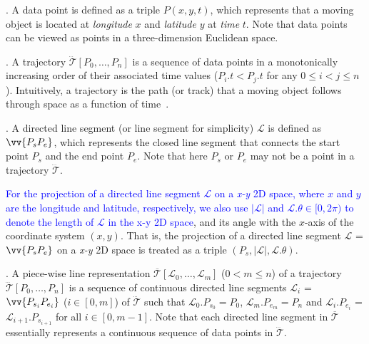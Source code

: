 . A data point is defined as a triple $P(x, y, t)$, which represents that a moving object is located at {\em longitude} $x$ and {\em latitude} $y$ at {\em time} $t$. Note that data points can be viewed as points in a three-dimension Euclidean space.

. A trajectory $\dddot{\mathcal{T}}[P_0, \ldots, P_n]$ is a sequence of data points in a monotonically increasing order of their associated time values (\ie $P_i.t < P_j.t$ for any $0\le i<j\le n$). Intuitively, a trajectory is the path (or track) that a moving object follows through space as a function of time~\cite{physics-trajectory}.


. A directed line segment (or line segment for simplicity) $\mathcal{L}$ is defined as $\vv{P_{s}P_{e}}$, which represents the closed line segment that connects the start point $P_s$ and the end point $P_e$.
Note that here $P_s$ or $P_e$ may not be a point in a trajectory $\dddot{\mathcal{T}}$.


\textcolor{blue}{For the projection of a directed line segment $\mathcal{L}$ on a \emph{x-y} 2D space, where $x$ and $y$ are the longitude and latitude, respectively, we also use $|\mathcal{L}|$ and $\mathcal{L}.\theta\in [0, 2\pi)$ to denote the length of $\mathcal{L}$ in the x-y 2D space}, and its angle with the $x$-axis of the coordinate system $(x, y)$.
 That is, the projection of a directed line segment $\mathcal{L}$ = $\vv{P_{s}P_{e}}$ on a \emph{x-y} 2D space is treated as a triple $(P_s, |\mathcal{L}|, \mathcal{L}.\theta)$.


. A piece-wise line representation $\overline{\mathcal{T}}[\mathcal{L}_0, \ldots , \mathcal{L}_m]$ ($0< m \le n$) of a trajectory $\dddot{\mathcal{T}}[P_0, \ldots, P_n]$ is a sequence of continuous directed line segments $\mathcal{L}_{i}$ = $\vv{P_{s_i}P_{e_i}}$ ($i\in[0,m]$) of $\dddot{\mathcal{T}}$  such that $\mathcal{L}_{0}.P_{s_0} = P_0$, $\mathcal{L}_{m}.P_{e_m} = P_n$ and  $\mathcal{L}_{i}.P_{e_i}$ = $\mathcal{L}_{i+1}.P_{s_{i+1}}$ for all $i\in[0, m-1]$. Note that each directed line segment in $\overline{\mathcal{T}}$ essentially represents a continuous sequence of data points in $\dddot{\mathcal{T}}$.

